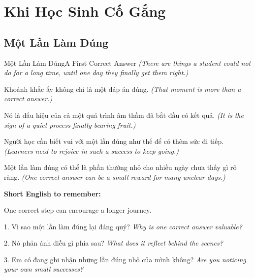 \chapter{Khi Học Sinh Cố Gắng}

\section{Một Lần Làm Đúng}
\begin{truyen}{Một Lần Làm Đúng}{A First Correct Answer}
\textit{(There are things a student could not do for a long time, until one day they finally get them right.)}

Khoảnh khắc ấy không chỉ là một đáp án đúng.
\textit{(That moment is more than a correct answer.)}

Nó là dấu hiệu của cả một quá trình âm thầm đã bắt đầu có kết quả.
\textit{(It is the sign of a quiet process finally bearing fruit.)}

Người học cần biết vui với một lần đúng như thế để có thêm sức đi tiếp.
\textit{(Learners need to rejoice in such a success to keep going.)}
\end{truyen}

\begin{baihoc}
Một lần làm đúng có thể là phần thưởng nhỏ cho nhiều ngày chưa thấy gì rõ ràng.
\textit{(One correct answer can be a small reward for many unclear days.)}
\end{baihoc}

\begin{ghinhoanh}
\textbf{Short English to remember:}

One correct step can encourage a longer journey.

\end{ghinhoanh}

\begin{tuhocnhanh}
1. Vì sao một lần làm đúng lại đáng quý? \textit{Why is one correct answer valuable?}

2. Nó phản ánh điều gì phía sau? \textit{What does it reflect behind the scenes?}

3. Em có đang ghi nhận những lần đúng nhỏ của mình không? \textit{Are you noticing your own small successes?}
\end{tuhocnhanh}
\ngancach

